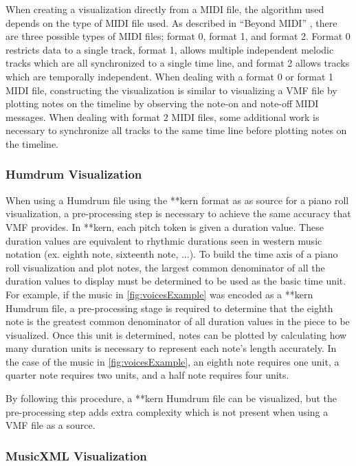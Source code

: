 When creating a visualization directly from a MIDI file, the algorithm used depends on the type of MIDI file used. As described in ``Beyond MIDI'' \citep*{HeSe97}, there are three possible types of MIDI files; format 0, format 1, and format 2. Format 0 restricts data to a single track, format 1, allows multiple independent melodic tracks which are all synchronized to a single time line, and format 2 allows tracks which are temporally independent. When dealing with a format 0 or format 1 MIDI file, constructing the visualization is similar to visualizing a VMF file by plotting notes on the timeline by observing the note-on and note-off MIDI messages. When dealing with format 2 MIDI files, some additional work is necessary to synchronize all tracks to the same time line before plotting notes on the timeline.

\subsubsection{Humdrum Visualization}

When using a Humdrum file using the **kern format as as source for a piano roll visualization, a pre-processing step is necessary to achieve the same accuracy that VMF provides. In **kern, each pitch token is given a duration value. These duration values are equivalent to rhythmic durations seen in western music notation (ex. eighth note, sixteenth note, ...). To build the time axis of a piano roll visualization and plot notes, the largest common denominator of all the duration values to display must be determined to be used as the basic time unit. For example, if the music in \ref{fig:voicesExample} was encoded as a **kern Humdrum file, a pre-processing stage is required to determine that the eighth note is the greatest common denominator of all duration values in the piece to be visualized. Once this unit is determined, notes can be plotted by calculating how many duration units is necessary to represent each note's length accurately. In the case of the music in \ref{fig:voicesExample}, an eighth note requires one unit, a quarter note requires two units, and a half note requires four units.

By following this procedure, a **kern Humdrum file can be visualized, but the pre-processing step adds extra complexity which is not present when using a VMF file as a source.

\subsubsection{MusicXML Visualization}

